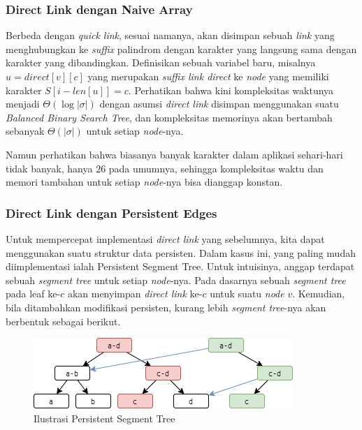 \documentclass[11pt, a4paper, final]{article}
\begin{document}
\subsubsection{Direct Link dengan Naive Array}

Berbeda dengan \textit{quick link}, sesuai namanya, akan disimpan sebuah \textit{link} yang menghubungkan ke \textit{suffix} palindrom dengan karakter yang langsung sama dengan karakter yang dibandingkan. Definisikan sebuah variabel baru, misalnya $u = direct[v][c]$ yang merupakan \textit{suffix link direct} ke \textit{node} yang memiliki karakter $S[i - len[u]] = c$. Perhatikan bahwa kini kompleksitas waktunya menjadi $\Theta(\log |\sigma|)$ dengan asumsi \textit{direct link} disimpan menggunakan suatu \textit{Balanced Binary Search Tree}, dan kompleksitas memorinya akan bertambah sebanyak $\Theta(|\sigma|)$ untuk setiap \textit{node}-nya.

Namun perhatikan bahwa biasanya banyak karakter dalam aplikasi sehari-hari tidak banyak, hanya $26$ pada umumnya, sehingga kompleksitas waktu dan memori tambahan untuk setiap \textit{node}-nya bisa dianggap konstan.

\subsubsection{Direct Link dengan Persistent Edges}

Untuk mempercepat implementasi \textit{direct link} yang sebelumnya, kita dapat menggunakan suatu struktur data persisten. Dalam kasus ini, yang paling mudah diimplementasi ialah Persistent Segment Tree. Untuk intuisinya, anggap terdapat sebuah \textit{segment tree} untuk setiap \textit{node}-nya. Pada dasarnya sebuah \textit{segment tree} pada leaf ke-$c$ akan menyimpan \textit{direct link} ke-$c$ untuk suatu \textit{node} $v$. Kemudian, bila ditambahkan modifikasi persisten, kurang lebih \textit{segment tree}-nya akan berbentuk sebagai berikut.

\begin{figure}[H]
\centering
\includegraphics[scale=0.8]{assets/persistent.png}
\caption{Ilustrasi Persistent Segment Tree}
\end{figure}
\end{document}
